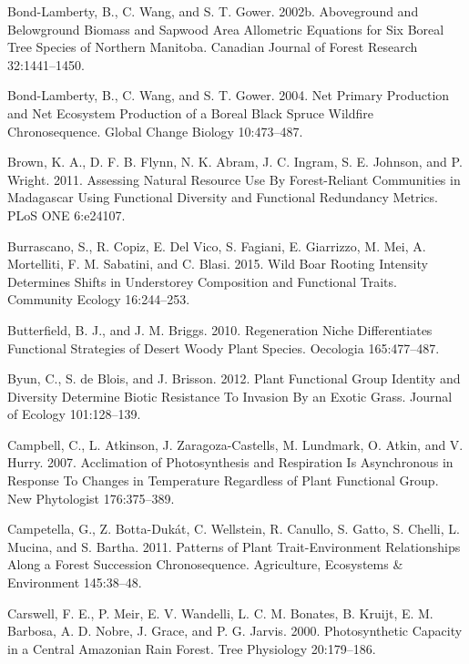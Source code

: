 \documentclass[11pt]{article}
\begin{document}
\begin{hangparas}{1.5em}{1}
\hypertarget{citeproc_bib_item_18}{Bond-Lamberty, B., C. Wang, and S. T. Gower. 2002b. Aboveground and Belowground Biomass and Sapwood Area Allometric Equations for Six Boreal Tree Species of Northern Manitoba. Canadian Journal of Forest Research 32:1441–1450.}

\hypertarget{citeproc_bib_item_19}{Bond-Lamberty, B., C. Wang, and S. T. Gower. 2004. Net Primary Production and Net Ecosystem Production of a Boreal Black Spruce Wildfire Chronosequence. Global Change Biology 10:473–487.}

\hypertarget{citeproc_bib_item_20}{Brown, K. A., D. F. B. Flynn, N. K. Abram, J. C. Ingram, S. E. Johnson, and P. Wright. 2011. Assessing Natural Resource Use By Forest-Reliant Communities in Madagascar Using Functional Diversity and Functional Redundancy Metrics. PLoS ONE 6:e24107.}

\hypertarget{citeproc_bib_item_21}{Burrascano, S., R. Copiz, E. Del Vico, S. Fagiani, E. Giarrizzo, M. Mei, A. Mortelliti, F. M. Sabatini, and C. Blasi. 2015. Wild Boar Rooting Intensity Determines Shifts in Understorey Composition and Functional Traits. Community Ecology 16:244–253.}

\hypertarget{citeproc_bib_item_22}{Butterfield, B. J., and J. M. Briggs. 2010. Regeneration Niche Differentiates Functional Strategies of Desert Woody Plant Species. Oecologia 165:477–487.}

\hypertarget{citeproc_bib_item_23}{Byun, C., S. de Blois, and J. Brisson. 2012. Plant Functional Group Identity and Diversity Determine Biotic Resistance To Invasion By an Exotic Grass. Journal of Ecology 101:128–139.}

\hypertarget{citeproc_bib_item_24}{Campbell, C., L. Atkinson, J. Zaragoza-Castells, M. Lundmark, O. Atkin, and V. Hurry. 2007. Acclimation of Photosynthesis and Respiration Is Asynchronous in Response To Changes in Temperature Regardless of Plant Functional Group. New Phytologist 176:375–389.}

\hypertarget{citeproc_bib_item_25}{Campetella, G., Z. Botta-Dukát, C. Wellstein, R. Canullo, S. Gatto, S. Chelli, L. Mucina, and S. Bartha. 2011. Patterns of Plant Trait-Environment Relationships Along a Forest Succession Chronosequence. Agriculture, Ecosystems \& Environment 145:38–48.}

\hypertarget{citeproc_bib_item_26}{Carswell, F. E., P. Meir, E. V. Wandelli, L. C. M. Bonates, B. Kruijt, E. M. Barbosa, A. D. Nobre, J. Grace, and P. G. Jarvis. 2000. Photosynthetic Capacity in a Central Amazonian Rain Forest. Tree Physiology 20:179–186.}


\end{hangparas}
\end{document}
